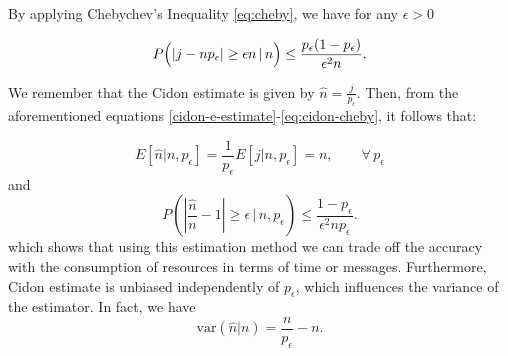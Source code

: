 \documentclass[11pt,a4paper,twoside,openright]{book}
\newcommand{\pc}{p_{\epsilon}}
\begin{document}
By applying Chebychev's Inequality \eqref{eq:cheby},  we have for any $\epsilon>0$
 
 \begin{equation}
P\Bigl( \left| j-n\pc\right| \geq \epsilon n \,|\, n \Bigr) \leq \frac{\pc(1-\pc)}{\epsilon^{2}n}.
\label{eq:cidon-cheby}
 \end{equation}
 
We remember that the Cidon estimate is given by $\hat{n}={\displaystyle \frac{j}{\pc}}$. Then, from the aforementioned equations \eqref{cidon-e-estimate}-\eqref{eq:cidon-cheby}, it follows that:

\begin{equation}
E[\hat{n}|n,\pc]=\frac{1}{\pc}E\left[j|n,\pc\right]=n, \qquad \forall \,\pc
\end{equation}
and
 \begin{equation}
P\left( \left| \frac{\hat{n}}{n}-1\right| \geq \epsilon  \,\big|\, n,\pc \right) \leq \frac{1-\pc}{\epsilon^{2}n\pc}.
 \end{equation}
which shows that using this estimation method we can trade off the accuracy with the consumption of resources in terms of time or messages. Furthermore, Cidon estimate is unbiased independently of $\pc$, which influences  the variance of the estimator. In fact, we have 
\begin{equation}
\textrm{var}(\hat{n}|n)  =  \frac{n}{\pc}-n.
\end{equation}

\end{document}
